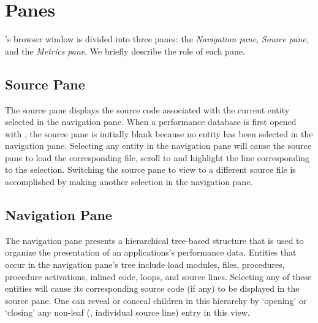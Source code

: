 
\section{Panes}
\label{sec:hpcviewer:panes}

\hpcviewer{}'s browser window is divided into three panes: the \emph{Navigation pane}, \emph{Source pane}, and the \emph{Metrics pane}.
We briefly describe the role of each pane.


\subsection{Source Pane}
\label{sec:pane-source}

The source pane displays the source code associated with the current entity selected in the navigation pane.
When a performance database is first opened with \hpcviewer{}, the source pane is initially blank because no entity has been selected in the navigation pane.
Selecting any entity in the navigation pane will cause the source pane to load the corresponding file, scroll to and highlight the line corresponding to the selection.
Switching the source pane to view to a different source file is accomplished by making another selection in the navigation pane.


\subsection{Navigation Pane}

The navigation pane presents a hierarchical tree-based structure that is used to organize the presentation of an applications's performance data.
Entities that occur in the navigation pane's tree include load modules, files, procedures, procedure activations, inlined code, loops, and source lines.
Selecting any of these entities will cause its corresponding source code (if any) to be displayed in the source pane.
One can reveal or conceal children in this hierarchy by `opening' or `closing' any non-leaf (\ie{}, individual source line) entry in this view.

